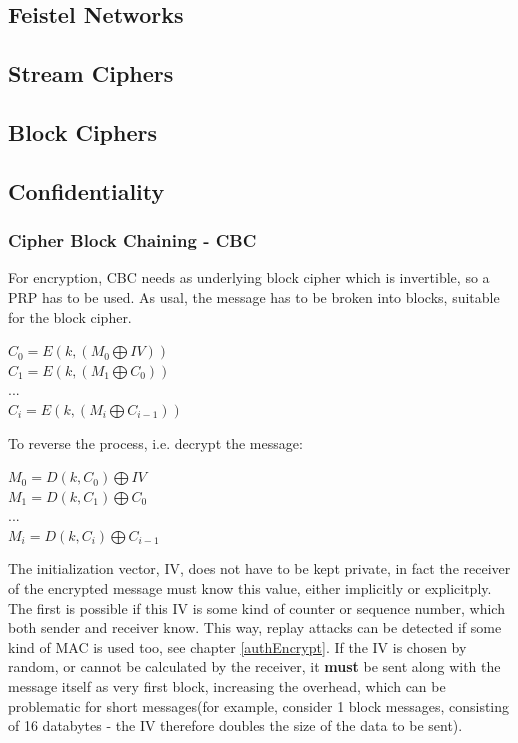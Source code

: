 \subsection{Feistel Networks}

\subsection{Stream Ciphers}

\subsection{Block Ciphers}

\subsection{Confidentiality}\label{confidentiality}

\subsubsection{Cipher Block Chaining - CBC}

For encryption, CBC needs as underlying block cipher which is invertible, so a PRP has to be used. 
As usal, the message has to be broken into blocks, suitable for the block cipher. 

\begin{center}
$ C_0 = E(k, (M_0 \bigoplus IV ) )  $
\\
$ C_1 = E(k, (M_1  \bigoplus C_0) ) $
\\
$...$
\\
$ C_i = E(k, (M_i \bigoplus C_{i-1} ) )  $
\end{center}

To reverse the process, i.e. decrypt the message:

\begin{center}
$ M_0 = D(k, C_0) \bigoplus IV $
\\
$ M_1 = D(k, C_1) \bigoplus C_0 $
\\
$...$
\\
$ M_i = D(k, C_i) \bigoplus C_{i-1} $
\end{center}

The initialization vector, IV, does not have to be kept private, in fact the receiver of the encrypted message must know this value,
either implicitly or explicitply. The first is possible if this IV is some kind of counter or sequence number, which both sender
and receiver know. This way, replay attacks can be detected if some kind of MAC is used too, see chapter \ref{authEncrypt}.
If the IV is chosen by random, or cannot be calculated by the receiver, it \textbf{must} be sent along with the message itself as
very first block, increasing the overhead, which can be problematic for short messages(for example, consider 1 block messages, consisting
of 16 databytes - the IV therefore doubles the size of the data to be sent).

